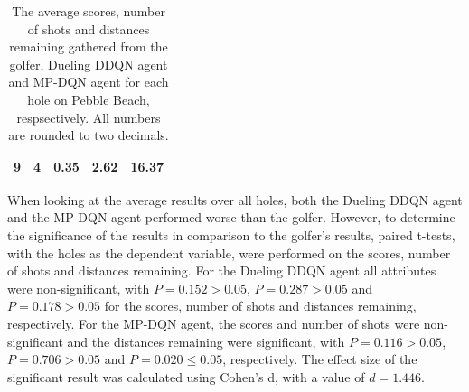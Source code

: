 \documentclass{kththesis}
\begin{document}
\begin{table}
\begin{subtable}{0.3\textwidth}
{\begin{tabular}{|c|c|c|c|c|}
        9 & 4 & 0.35 & 2.62 & 16.37 \\ \hline
    \end{tabular}
    }
    \end{subtable}
    \hfill
    \begin{subtable}{0.3\textwidth}
    \centering
    \end{subtable}
    \caption{The average scores, number of shots and distances remaining gathered from the golfer, Dueling DDQN agent and MP-DQN agent for each hole on Pebble Beach, respsectively. All numbers are rounded to two decimals.}
    \label{tab:pebble_average_results}
\end{table}

When looking at the average results over all holes, both the Dueling DDQN agent and the MP-DQN agent performed worse than the golfer. However, to determine the significance of the results in comparison to the golfer's results, paired t-tests, with the holes as the dependent variable, were performed on the scores, number of shots and distances remaining. For the Dueling DDQN agent all attributes were non-significant, with $P = 0.152 > 0.05$, $P = 0.287 > 0.05$ and $P = 0.178 > 0.05$ for the scores, number of shots and distances remaining, respectively. For the MP-DQN agent, the scores and number of shots were non-significant and the distances remaining were significant, with $P = 0.116 > 0.05$, $P = 0.706 > 0.05$ and $P = 0.020 \leq 0.05$, respectively. The effect size of the significant result was calculated using Cohen's d, with a value of $d = 1.446$.
\end{document}
